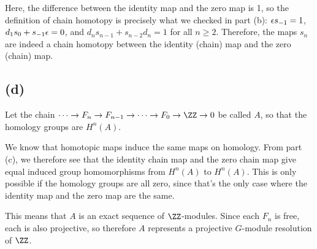 \documentclass[12pt, reqno]{amsart}
\begin{document}
Here, the difference between the identity map and the zero map is 1, so the
definition of chain homotopy is precisely what we checked in part (b):
$\epsilon s_{-1} = 1$, $d_1 s_0 + s_{-1}\epsilon = 0$, and 
$d_n s_{n-1} + s_{n-2} d_{n} = 1$ for all $n \ge 2$.
Therefore, the maps $s_n$ are indeed a chain homotopy between the identity
(chain) map and the zero (chain) map.

\subsection*{(d)}

Let the chain $\cdots \to F_n \to F_{n-1} \to \cdots \to F_0 \to \ZZ \to 0$ be
called $A$, so that the homology groups are $H^n (A)$.

We know that homotopic maps induce the same maps on homology.
From part (c), we therefore see that the identity chain map and the zero chain
map give equal induced group homomorphisms from $H^n (A)$ to $H^n(A)$. This is
only possible if the homology groups are all zero, since that's the only case
where the identity map and the zero map are the same. 

This means that $A$ is an exact sequence of $\ZZ$-modules. Since each $F_n$ is
free, each is also projective, so therefore $A$ represents a projective
$G$-module resolution of $\ZZ$.
\end{document}
